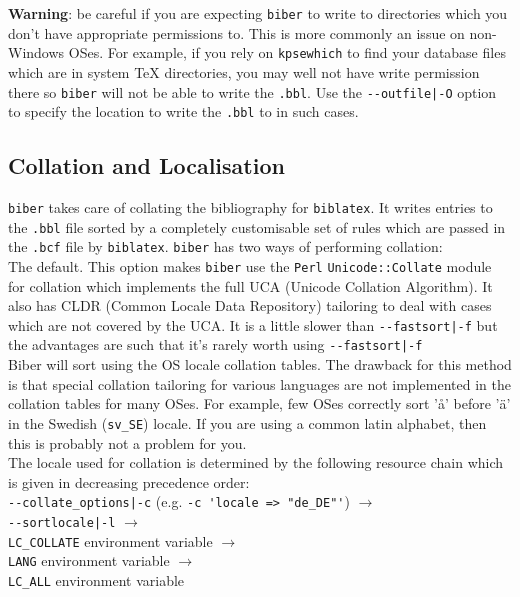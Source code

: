 \documentclass{ltxdockit}
\def\biberex#1{\hbox{\hspace{-4em}\texttt{\small \detokenize{#1}}}}
\begin{document}
\noindent \textbf{Warning}: be careful if you are expecting \verb+biber+ to
write to directories which you don't have appropriate permissions to. This
is more commonly an issue on non-Windows OSes. For example, if you rely on
\verb+kpsewhich+ to find your database files which are in system TeX
directories, you may well not have write permission there so \verb+biber+
will not be able to write the \verb+.bbl+. Use the \verb+--outfile|-O+
option to specify the location to write the \verb+.bbl+ to in such cases.

\subsection{Collation and Localisation}\label{coll}

\verb+biber+ takes care of collating the bibliography for
\verb+biblatex+. It writes entries to the \verb+.bbl+ file sorted by a
completely customisable set of rules which are passed in the
\verb+.bcf+ file by \verb+biblatex+. \verb+biber+ has two ways of performing
collation:\\[2ex]

\biberex{--collate|-C}
  \noindent The default. This option makes \verb+biber+ use the \verb+Perl+
  \verb+Unicode::Collate+ module for collation which implements the full UCA (Unicode
  Collation Algorithm). It also has CLDR (Common Locale Data
  Repository) tailoring to deal with cases which are not covered by the
  UCA. It is a little slower than \verb+--fastsort|-f+ but the
  advantages are such that it's rarely worth using \verb+--fastsort|-f+\\[1ex]

\biberex{--fastsort|-f}
  \noindent Biber will sort using
  the OS locale collation tables. The drawback for this method is that special
  collation tailoring for various languages are not implemented in the
  collation tables for many OSes. For example, few OSes correctly sort 'å'
  before 'ä' in the Swedish (\verb+sv_SE+) locale. If you are using a
  common latin alphabet, then this is probably not a problem for you.\\[2ex]

\noindent The locale used for collation is determined by the following resource
chain which is given in decreasing precedence order:\\[2ex]

\noindent\verb+--collate_options|-c+ (e.g. \verb+-c 'locale => "de_DE"'+) $\rightarrow$\\
\hspace*{1em}\verb+--sortlocale|-l+ $\rightarrow$\\
\hspace*{2em}\verb+LC_COLLATE+ environment variable $\rightarrow$\\
\hspace*{3em}\verb+LANG+ environment variable $\rightarrow$\\
\hspace*{4em}\verb+LC_ALL+ environment variable\\[2ex]
\end{document}
